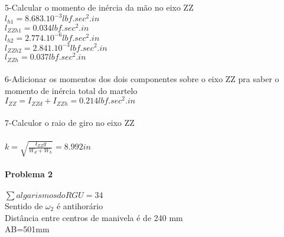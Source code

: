 \documentclass[11pt,a4paper]{article}
\begin{document}
5-Calcular o momento de inércia da mão no eixo ZZ\\
$l_{h1}=8.683.10^{-3} lbf.sec^2.in$\\
$l_{ZZh1}=0.034 lbf.sec^2.in$\\
$l_{h2}=2.774.10^{-6} lbf.sec^2.in$\\
$l_{ZZh2}=2.841.10^{-3} lbf.sec^2.in$\\
$l_{ZZh}=0.037 lbf.sec^2.in$\\ 
\\
6-Adicionar os momentos dos dois componentes sobre o eixo ZZ pra saber o momento de inércia total do martelo\\
$I_{ZZ}=I_{ZZd}+I_{ZZh}=0.214lbf.sec^2.in$\\
\\
7-Calculor o raio de giro no eixo ZZ\\
\\
$k=\sqrt{\frac{I_{ZZ}g}{W_d + W_h}}=8.992 in$\\
\\
\textbf{Problema 2}\\
\\
$\sum algarismos do RGU=34$\\
Sentido de $\omega_2$ é antihorário\\
Distância entre centros de manivela é de 240 mm \\
AB=501mm
\end{document}
